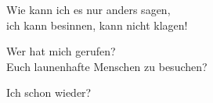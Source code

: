 \documentclass[a4paper,DIV=calc,11pt]{scrbook}
\begin{document}
\act

\scene


\begin{drama*} 	%
	\lospeaks Wie kann ich es nur anders sagen,\\
	ich kann besinnen, kann nicht klagen!	%
	
	
	\wispeaks Wer hat mich gerufen?\\
	Euch launenhafte Menschen zu besuchen?
	
	\lospeaks Ich schon wieder?
\end{drama*}
\end{document}
